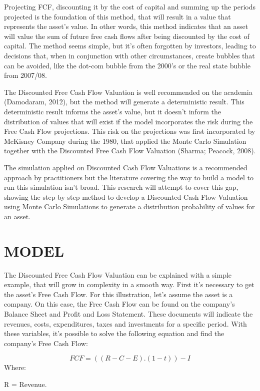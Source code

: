 \documentclass[
  11pt,
  a4paper,
]{article}
\begin{document}
Projecting FCF, discounting it by the cost of capital and summing up the periods projected is the foundation of this method, that will result in a value that represents the asset's value. In other words, this method indicates that an asset will value the sum of future free cash flows after being discounted by the cost of capital. The method seems simple, but it's often forgotten by investors, leading to decisions that, when in conjunction with other circumstances, create bubbles that can be avoided, like the dot-com bubble from the 2000's or the real state bubble from 2007/08.

The Discounted Free Cash Flow Valuation is well recommended on the academia (Damodaram, 2012), but the method will generate a deterministic result. This deterministic result informs the asset's value, but it doesn't inform the distribution of values that will exist if the model incorporates the risk during the Free Cash Flow projections. This risk on the projections was first incorporated by McKisney Company during the 1980, that applied the Monte Carlo Simulation together with the Discounted Free Cash Flow Valuation (Sharma; Peacock, 2008).

The simulation applied on Discounted Cash Flow Valuations is a recommended approach by practitioners but the literature covering the way to build a model to run this simulation isn't broad. This research will attempt to cover this gap, showing the step-by-step method to develop a Discounted Cash Flow Valuation using Monte Carlo Simulations to generate a distribution probability of values for an asset.

\hypertarget{model}{%
\section{MODEL}\label{model}}

The Discounted Free Cash Flow Valuation can be explained with a simple example, that will grow in complexity in a smooth way. First it's necessary to get the asset's Free Cash Flow. For this illustration, let's assume the asset is a company. On this case, the Free Cash Flow can be found on the company's Balance Sheet and Profit and Loss Statement. These documents will indicate the revenues, costs, expenditures, taxes and investments for a specific period. With these variables, it's possible to solve the following equation and find the company's Free Cash Flow:

\[FCF = ((R-C-E).(1-t))-I\]
Where:

R = Revenue.
\end{document}
